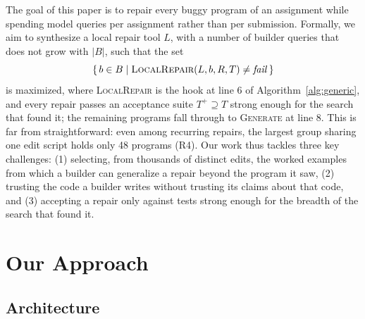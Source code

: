 \documentclass[acmsmall,screen,review,anonymous,nonacm]{acmart}
\newcommand{\Fn}[1]{\textsc{#1}}
\newcommand{\V}[1]{\ensuremath{\mathit{#1}}}
\begin{document}
The goal of this paper is to repair every buggy program of an assignment while spending model queries per assignment rather than per submission. Formally, we aim to synthesize a local repair tool $L$, with a number of builder queries that does not grow with $|B|$, such that the set
\[
\{\, b \in B \mid \Fn{LocalRepair}(L, b, R, T) \neq \V{fail} \,\}
\]
is maximized, where \Fn{LocalRepair} is the hook at line 6 of Algorithm~\ref{alg:generic}, and every repair passes an acceptance suite $T^{+} \supseteq T$ strong enough for the search that found it; the remaining programs fall through to \Fn{Generate} at line 8. This is far from straightforward: even among recurring repairs, the largest group sharing one edit script holds only 48 programs (R4). Our work thus tackles three key challenges: (1) selecting, from thousands of distinct edits, the worked examples from which a builder can generalize a repair beyond the program it saw, (2) trusting the code a builder writes without trusting its claims about that code, and (3) accepting a repair only against tests strong enough for the breadth of the search that found it.

\section{Our Approach}
\label{sec:approach}

\subsection{Architecture}
\end{document}
